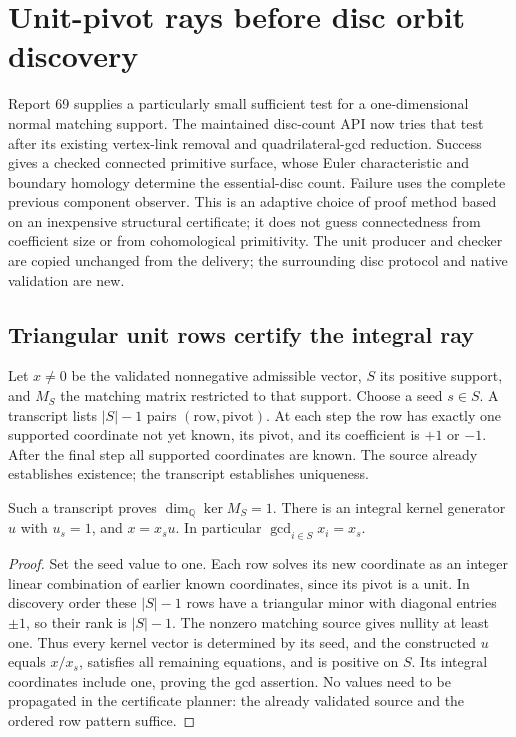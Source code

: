 \section{Unit-pivot rays before disc orbit discovery}
\label{sec:unit-ray-native}

Report 69 supplies a particularly small sufficient test for a one-dimensional
normal matching support. The maintained disc-count API now tries that test
after its existing vertex-link removal and quadrilateral-gcd reduction.
Success gives a checked connected primitive surface, whose Euler
characteristic and boundary homology determine the essential-disc count.
Failure uses the complete previous component observer. This is an adaptive
choice of proof method based on an inexpensive structural certificate;
it does not guess connectedness from coefficient size or from cohomological
primitivity. The unit producer and checker are copied unchanged from the
delivery; the surrounding disc protocol and native validation are new.

\subsection{Triangular unit rows certify the integral ray}

Let $x\ne0$ be the validated nonnegative admissible vector, $S$ its positive
support, and $M_S$ the matching matrix restricted to that support. Choose a
seed $s\in S$. A transcript lists $|S|-1$ pairs $(\text{row},\text{pivot})$.
At each step the row has exactly one supported coordinate not yet known,
its pivot, and its coefficient is $+1$ or $-1$. After the final step all
supported coordinates are known. The source already establishes existence;
the transcript establishes uniqueness.

\begin{proposition}
Such a transcript proves $\dim_{\mathbb Q}\ker M_S=1$. There is an integral
kernel generator $u$ with $u_s=1$, and $x=x_su$. In particular
$\gcd_{i\in S}x_i=x_s$.
\end{proposition}
\begin{proof}
Set the seed value to one. Each row solves its new coordinate as an integer
linear combination of earlier known coordinates, since its pivot is a unit.
In discovery order these $|S|-1$ rows have a triangular minor with diagonal
entries $\pm1$, so their rank is $|S|-1$. The nonzero matching source gives
nullity at least one. Thus every kernel vector is determined by its seed,
and the constructed $u$ equals $x/x_s$, satisfies all remaining equations,
and is positive on $S$. Its integral coordinates include one, proving the
gcd assertion. No values need to be propagated in the certificate planner:
the already validated source and the ordered row pattern suffice.
\end{proof}

